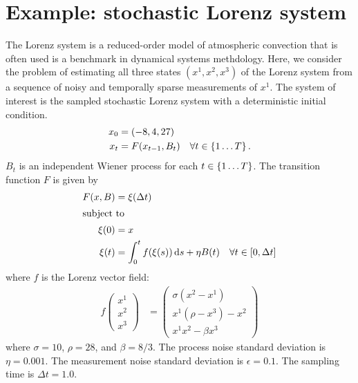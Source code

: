 \documentclass{article} %
\begin{document}
\section{Example: stochastic Lorenz system}
\label{sec:stochastic-lorenz-system}
The Lorenz system is a reduced-order model of atmospheric convection that is often used is a benchmark in dynamical systems methdology.
Here, we consider the problem of estimating all three states \((x^1, x^2, x^3)\) of the Lorenz system from a sequence of noisy and temporally sparse measurements of \(x^1\).
The system of interest is the sampled stochastic Lorenz system with a deterministic initial condition.
\begin{subequations}
  \begin{align}
    x_0 &=  (-8, 4, 27) 
    \\
    x_{t} &= F(x_{t-1}, B_t) &\forall t \in \cbr{1 \ldots T}.
  \end{align}
\end{subequations}
\(B_t\) is an independent Wiener process for each \(t \in \cbr{1 \ldots T}\).
The transition function \(F\) is given by
\begin{align}
  F(x, B) &= \xi(\Delta t) \\
  \intertext{subject to}
  \xi(0) &= x \\
  \xi(t) &= \int_0^t f(\xi(s)) \dif s + \eta B(t) &\forall t \in [0, \Delta t]
\end{align}
where \(f\) is the Lorenz vector field:
\begin{subequations}
\label{eq:stochastic-lorenz-system}
\begin{align}
  f\begin{pmatrix}
    x^1\\
    x^2\\
    x^3
  \end{pmatrix}
  &= \begin{pmatrix}
    \sigma (x^2 - x^1)\\
    x^1(\rho - x^3) - x^2\\
    x^1 x^2 - \beta x^3
  \end{pmatrix}
\end{align}
\end{subequations}
where \(\sigma = 10\), \(\rho = 28\), and \(\beta = 8/3\).
The process noise standard deviation is \(\eta = 0.001\).
The measurement noise standard deviation is \(\epsilon = 0.1\).
The sampling time is \(\Delta t = 1.0\).
\end{document}

